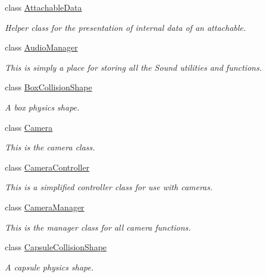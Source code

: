 \begin{DoxyCompactItemize}
class \hyperlink{structMezzanine_1_1AttachableData}{AttachableData}
\begin{DoxyCompactList}\small\item\em Helper class for the presentation of internal data of an attachable. \item\end{DoxyCompactList}\item 
class \hyperlink{classMezzanine_1_1AudioManager}{AudioManager}
\begin{DoxyCompactList}\small\item\em This is simply a place for storing all the Sound utilities and functions. \item\end{DoxyCompactList}\item 
class \hyperlink{classMezzanine_1_1BoxCollisionShape}{BoxCollisionShape}
\begin{DoxyCompactList}\small\item\em A box physics shape. \item\end{DoxyCompactList}\item 
class \hyperlink{classMezzanine_1_1Camera}{Camera}
\begin{DoxyCompactList}\small\item\em This is the camera class. \item\end{DoxyCompactList}\item 
class \hyperlink{classMezzanine_1_1CameraController}{CameraController}
\begin{DoxyCompactList}\small\item\em This is a simplified controller class for use with cameras. \item\end{DoxyCompactList}\item 
class \hyperlink{classMezzanine_1_1CameraManager}{CameraManager}
\begin{DoxyCompactList}\small\item\em This is the manager class for all camera functions. \item\end{DoxyCompactList}\item 
class \hyperlink{classMezzanine_1_1CapsuleCollisionShape}{CapsuleCollisionShape}
\begin{DoxyCompactList}\small\item\em A capsule physics shape. \item\end{DoxyCompactList}\item 

\end{DoxyCompactItemize}
